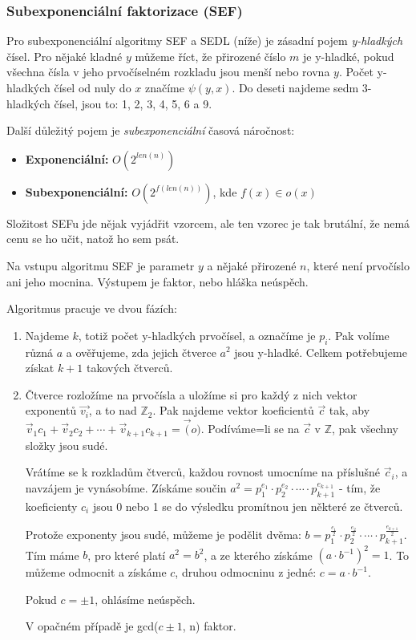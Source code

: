 \documentclass[10pt,a4paper]{article}
\begin{document}
\subsubsection{Subexponenciální faktorizace (SEF)}
Pro subexponenciální algoritmy SEF a SEDL (níže) je zásadní pojem \textit{y-hladkých} čísel. Pro nějaké kladné $y$ můžeme říct, že přirozené číslo $m$ je y-hladké, pokud všechna čísla v jeho prvočíselném rozkladu jsou menší nebo rovna $y$. Počet y-hladkých čísel od nuly do $x$ značíme $\psi(y, x)$. Do deseti najdeme sedm 3-hladkých čísel, jsou to: 1, 2, 3, 4, 5, 6 a 9.

Další důležitý pojem je \textit{subexponenciální} časová náročnost:
\begin{itemize}
\item \textbf{Exponenciální:} $O(2^{len(n)})$
\item \textbf{Subexponenciální:} $O(2^{f(len(n))})$, kde $f(x)\in o(x)$
\end{itemize}

Složitost SEFu jde nějak vyjádřit vzorcem, ale ten vzorec je tak brutální, že nemá cenu se ho učit, natož ho sem psát.

Na vstupu algoritmu SEF je parametr $y$ a nějaké přirozené $n$, které není prvočíslo ani jeho mocnina. Výstupem je faktor, nebo hláška neúspěch. 

Algoritmus pracuje ve dvou fázích:

\begin{enumerate}
\item Najdeme $k$, totiž počet y-hladkých prvočísel, a označíme je $p_i$. Pak volíme různá $a$ a ověřujeme, zda jejich čtverce $a^2$ jsou y-hladké. Celkem potřebujeme získat $k+1$ takových čtverců.
\item Čtverce rozložíme na prvočísla a uložíme si pro každý z nich vektor exponentů $\vec{v_i}$, a to nad $\mathbb{Z}_2$. Pak najdeme vektor koeficientů $\vec{c}$ tak, aby $\vec{v}_1c_1 + \vec{v}_2c_2  + \cdots + \vec{v}_{k+1}c_{k+1} = \vec(o)$. Podíváme=li se na $\vec{c}$ v  $\mathbb{Z}$, pak všechny složky jsou sudé. 

Vrátíme se k rozkladům čtverců, každou rovnost umocníme na příslušné $\vec{c}_i$, a navzájem je vynásobíme. Získáme součin $a^2 = p_1^{e_1} \cdot p_2^{e_2} \cdot \cdots \cdot p_{k+1}^{e_{k+1}}$ - tím, že koeficienty $c_i$ jsou 0 nebo 1 se do výsledku promítnou jen některé ze čtverců.

Protože exponenty jsou sudé, můžeme je podělit dvěma: $b = p_1^{\frac{e_1}{2}} \cdot p_2^{\frac{e_2}{2}} \cdot \cdots \cdot p_{k+1}^{\frac{e_{k+1}}{2}}$. Tím máme $b$, pro které platí $a^2 = b^2$, a ze kterého získáme $(a\cdot b^{-1})^2 = 1$. To můžeme odmocnit a získáme $c$, druhou odmocninu z jedné: $c = a\cdot b^{-1}$.

Pokud $c = \pm 1$, ohlásíme neúspěch.

V opačném případě je gcd($c \pm 1$, n) faktor.
\end{enumerate}
\end{document}
